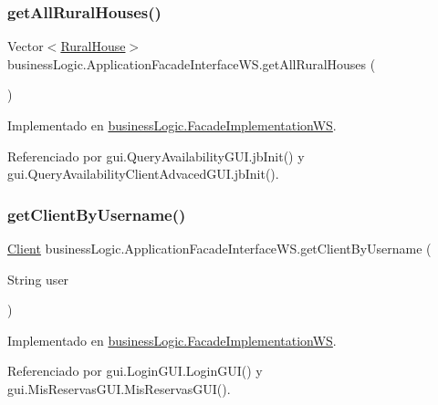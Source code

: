 \subsubsection{\texorpdfstring{getAllRuralHouses()}{getAllRuralHouses()}}
{\footnotesize\ttfamily Vector$<$\mbox{\hyperlink{classdomain_1_1_rural_house}{Rural\+House}}$>$ business\+Logic.\+Application\+Facade\+Interface\+W\+S.\+get\+All\+Rural\+Houses (\begin{DoxyParamCaption}{ }\end{DoxyParamCaption})}



Implementado en \mbox{\hyperlink{classbusiness_logic_1_1_facade_implementation_w_s_aa6f21ddb40ca6cd752a13e31ff016e7e}{business\+Logic.\+Facade\+Implementation\+WS}}.



Referenciado por gui.\+Query\+Availability\+G\+U\+I.\+jb\+Init() y gui.\+Query\+Availability\+Client\+Advaced\+G\+U\+I.\+jb\+Init().

\mbox{\label{interfacebusiness_logic_1_1_application_facade_interface_w_s_a0d69ed91aa71325dedc777f059999e93}} 
\subsubsection{\texorpdfstring{getClientByUsername()}{getClientByUsername()}}
{\footnotesize\ttfamily \mbox{\hyperlink{classdomain_1_1_client}{Client}} business\+Logic.\+Application\+Facade\+Interface\+W\+S.\+get\+Client\+By\+Username (\begin{DoxyParamCaption}\item[{String}]{user }\end{DoxyParamCaption})}



Implementado en \mbox{\hyperlink{classbusiness_logic_1_1_facade_implementation_w_s_a49e8bd0f75fee0f774c78f1631509a12}{business\+Logic.\+Facade\+Implementation\+WS}}.



Referenciado por gui.\+Login\+G\+U\+I.\+Login\+G\+U\+I() y gui.\+Mis\+Reservas\+G\+U\+I.\+Mis\+Reservas\+G\+U\+I().

